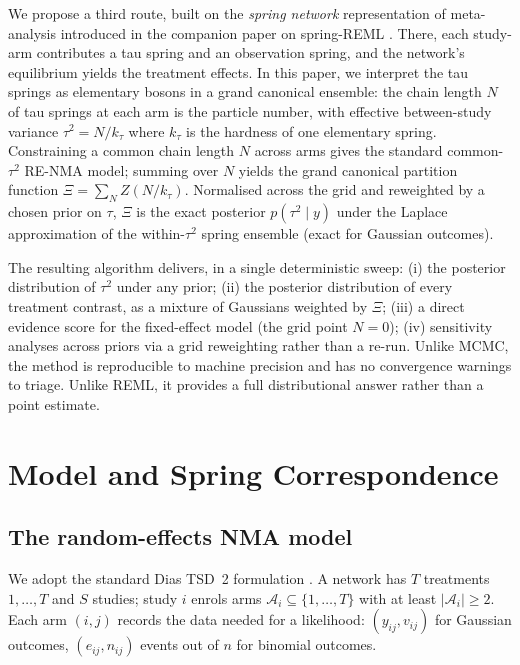 \documentclass[12pt]{article}
\begin{document}
We propose a third route, built on the \emph{spring network} representation of meta-analysis introduced in the
companion paper on spring-REML \citep{papakonstantinou2025spring}. There, each study-arm contributes a tau spring
and an observation spring, and the network's equilibrium yields the
treatment effects. In this paper, we interpret the tau springs as
elementary bosons in a grand canonical ensemble: the chain length
$N$ of tau springs at each arm is the particle number, with
effective between-study variance $\tau^2 = N / k_\tau$ where
$k_\tau$ is the hardness of one elementary spring. Constraining a
common chain length $N$ across arms gives the standard
common-$\tau^2$ RE-NMA model; summing over $N$ yields the grand
canonical partition function
$\Xi = \sum_N Z(N / k_\tau)$.
Normalised across the grid and reweighted by a chosen prior on
$\tau$, $\Xi$ is the exact posterior $p(\tau^2 \mid y)$ under the
Laplace approximation of the within-$\tau^2$ spring ensemble (exact
for Gaussian outcomes).

The resulting algorithm delivers, in a single deterministic sweep:
(i) the posterior distribution of $\tau^2$ under any prior;
(ii) the posterior distribution of every treatment contrast, as a
mixture of Gaussians weighted by $\Xi$;
(iii) a direct evidence score for the fixed-effect model (the grid
point $N = 0$);
(iv) sensitivity analyses across priors via a grid reweighting
rather than a re-run.
Unlike MCMC, the method is reproducible to machine precision and has
no convergence warnings to triage. Unlike REML, it provides a full
distributional answer rather than a point estimate.

\section{Model and Spring Correspondence}\label{sec:model}

\subsection{The random-effects NMA model}

We adopt the standard Dias TSD~2 formulation
\citep{dias2013tsd2}. A network has $T$ treatments
$1, \ldots, T$ and $S$ studies; study $i$ enrols arms
$\mathcal{A}_i \subseteq \{1, \ldots, T\}$ with at least
$|\mathcal{A}_i| \ge 2$. Each arm $(i, j)$ records the data
needed for a likelihood:
$(y_{ij}, v_{ij})$ for Gaussian outcomes, $(e_{ij}, n_{ij})$
events out of $n$ for binomial outcomes.
\end{document}
